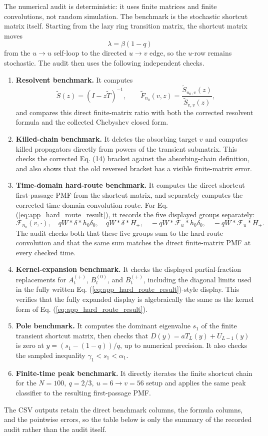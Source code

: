 \documentclass[superscriptaddress, amsmath, amssymb, aps, pre, floatfix]{revtex4-2}
\begin{document}
The numerical audit is deterministic: it uses finite matrices and finite convolutions, not random simulation.  The benchmark is the stochastic shortcut matrix itself.  Starting from the lazy ring transition matrix, the shortcut matrix moves
\[
  \lambda=\beta(1-q)
\]
from the \(u\to u\) self-loop to the directed \(u\to v\) edge, so the \(u\)-row remains stochastic.  The audit then uses the following independent checks.
\begin{enumerate}
\item \textbf{Resolvent benchmark.}  It computes
\[
  \widetilde S(z)=(I-z\widetilde T)^{-1},
  \qquad
  \widetilde F_{n_0}(v,z)=\frac{\widetilde S_{n_0,v}(z)}{\widetilde S_{v,v}(z)},
\]
and compares this direct finite-matrix ratio with both the corrected resolvent formula and the collected Chebyshev closed form.
\item \textbf{Killed-chain benchmark.}  It deletes the absorbing target \(v\) and computes killed propagators directly from powers of the transient submatrix.  This checks the corrected Eq. (14) bracket against the absorbing-chain definition, and also shows that the old reversed bracket has a visible finite-matrix error.
\item \textbf{Time-domain hard-route benchmark.}  It computes the direct shortcut first-passage PMF from the shortcut matrix, and separately computes the corrected time-domain convolution route.  For Eq. (\ref{eq:app_hard_route_result}), it records the five displayed groups separately:
\[
\mathcal F_{n_0}(v,\cdot),\quad
qW*\delta*h_0\delta_0,\quad
qW*\delta*H_+,\quad
-qW*\mathcal F_u*h_0\delta_0,\quad
-qW*\mathcal F_u*H_+.
\]
The audit checks both that these five groups sum to the hard-route convolution and that the same sum matches the direct finite-matrix PMF at every checked time.
\item \textbf{Kernel-expansion benchmark.}  It checks the displayed partial-fraction replacements for \(A_t^{(+)}\), \(B_t^{(0)}\), and \(B_t^{(+)}\), including the diagonal limits used in the fully written Eq. (\ref{eq:app_hard_route_result})-style display.  This verifies that the fully expanded display is algebraically the same as the kernel form of Eq. (\ref{eq:app_hard_route_result}).
\item \textbf{Pole benchmark.}  It computes the dominant eigenvalue \(s_1\) of the finite transient shortcut matrix, then checks that \(D(y)=aT_L(y)+U_{L-1}(y)\) is zero at \(y=(s_1-(1-q))/q\), up to numerical precision.  It also checks the sampled inequality \(\gamma_1<s_1<\alpha_1\).
\item \textbf{Finite-time peak benchmark.}  It directly iterates the finite shortcut chain for the \(N=100,\ q=2/3,\ u=6\to v=56\) setup and applies the same peak classifier to the resulting first-passage PMF.
\end{enumerate}
The CSV outputs retain the direct benchmark columns, the formula columns, and the pointwise errors, so the table below is only the summary of the recorded audit rather than the audit itself.
\end{document}
